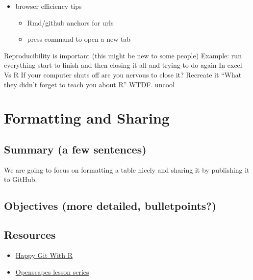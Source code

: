 \documentclass[]{book}
\providecommand{\tightlist}{%
  \setlength{\itemsep}{0pt}\setlength{\parskip}{0pt}}
\begin{document}
\begin{itemize}
\tightlist
\item
  browser efficiency tips

  \begin{itemize}
  \tightlist
  \item
    Rmd/github anchors for urls
  \item
    press command to open a new tab
  \end{itemize}
\end{itemize}

Reproducibility is important (this might be new to some people)
Example: run everything start to finish and then closing it all and trying to do again
In excel
Vs R
If your computer shuts off are you nervous to close it?
Recreate it
``What they didn't forget to teach you about R'' WTDF. uncool

\hypertarget{format}{%
\chapter{Formatting and Sharing}\label{format}}

\hypertarget{summary-a-few-sentences-4}{%
\section{Summary (a few sentences)}\label{summary-a-few-sentences-4}}

We are going to focus on formatting a table nicely and sharing it by publishing it to GitHub.

\hypertarget{objectives-more-detailed-bulletpoints-4}{%
\section{Objectives (more detailed, bulletpoints?)}\label{objectives-more-detailed-bulletpoints-4}}

\hypertarget{resources-6}{%
\section{Resources}\label{resources-6}}

\begin{itemize}
\tightlist
\item
  \href{https://happygitwithr.com/}{Happy Git With R}
\item
  \href{https://openscapes.github.io/series}{Openscapes lesson series}
\end{itemize}
\end{document}
